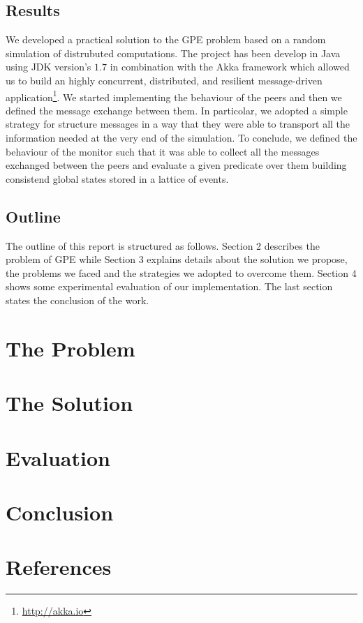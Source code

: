 \documentclass[12pt]{article}
\begin{document}
\subsection*{Results}

We developed a practical solution to the GPE problem based on a random simulation of distrubuted computations. The project has been develop in Java using JDK version's $1.7$ in combination with the Akka framework which allowed us to build an highly concurrent, distributed, and resilient message-driven application\footnote{\url{http://akka.io}}. We started implementing the behaviour of the peers and then we defined the message exchange between them. In particolar, we adopted a simple strategy for structure messages in a way that they were able to transport all the information needed at the very end of the simulation. To conclude, we defined the behaviour of the monitor such that it was able to collect all the messages exchanged between the peers and evaluate a given predicate over them building consistend global states stored in a lattice of events.

\subsection*{Outline}

The outline of this report is structured as follows. Section 2 describes the problem of GPE while Section 3 explains details about the solution we propose, the problems we faced and the strategies we adopted to overcome them. Section 4 shows some experimental evaluation of our implementation. The last section states the conclusion of the work.

\section{The Problem}

\section{The Solution}

\section{Evaluation}

\section{Conclusion}

\section{References}
\end{document}
